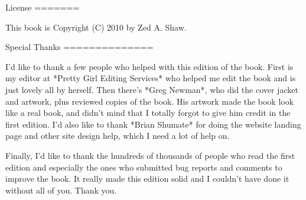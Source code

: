 License
=======

This book is Copyright (C) 2010 by Zed A. Shaw.


Special Thanks
==============

I'd like to thank a few people who helped with this edition of the book.  First
is my editor at *Pretty Girl Editing Services* who helped me edit the book and is
just lovely all by herself.  Then there's *Greg Newman*, who did the cover jacket
and artwork, plus reviewed copies of the book.  His artwork made the book look
like a real book, and didn't mind that I totally forgot to give him credit in
the first edition.  I'd also like to thank *Brian Shumate* for doing the website
landing page and other site design help, which I need a lot of help on.

Finally, I'd like to thank the hundreds of thousands of people who read the first
edition and especially the ones who submitted bug reports and comments to improve
the book.  It really made this edition solid and I couldn't have done it without 
all of you.  Thank you.
